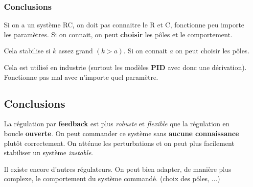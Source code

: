 \documentclass{report}
\begin{document}
\subsubsection{Conclusions}
Si on a un système RC, on doit pas connaitre le R et C, fonctionne peu importe les paramètres. Si on connait, on peut \textbf{choisir} les pôles et le comportement.\par 
Cela stabilise si $k$ assez grand $(k>a)$. Si on connait $a$ on peut choisir les pôles.\par 
Cela est utilisé en industrie (surtout les modèles \textbf{PID} avec donc une dérivation). Fonctionne pas mal avec n'importe quel paramètre.

\subsection{Conclusions}
La régulation par \textbf{feedback} est plus \textit{robuste} et \textit{flexible} que la régulation en boucle \textbf{ouverte}. On peut commander ce système sans \textbf{aucune connaissance} plutôt correctement. On atténue les perturbations et on peut plus facilement stabiliser un système \textit{instable}.\par 
Il existe encore d'autres régulateurs. On peut bien adapter, de manière plus complexe, le comportement du système commandé. (choix des pôles, ...)
\end{document}
